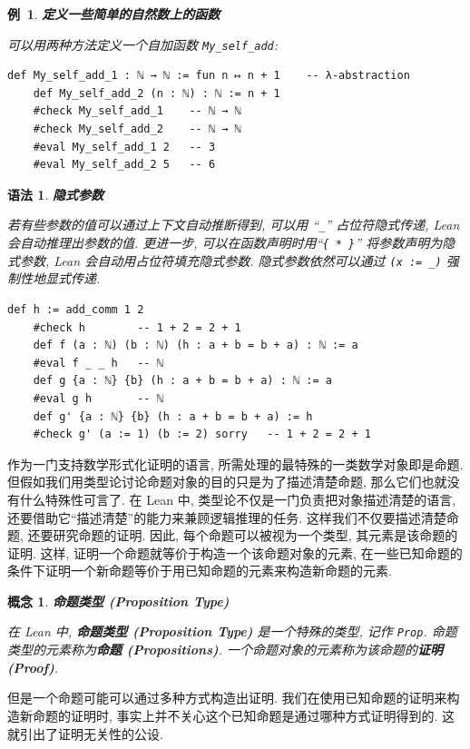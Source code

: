 \documentclass[UTF8]{ctexart}
\DeclareMathOperator{\0}{\mathbf{0}}                    %
\newcommand{\<}{\langle}
\renewcommand{\>}{\rangle}                              %
\newenvironment{dfn_box}{
    \begin{tcolorbox}[enhanced, colback=dfn_green2, boxrule=0pt, frame hidden,
        borderline west={0.7mm}{0.1mm}{dfn_green1},breakable]
    }
    {\end{tcolorbox}}
\newenvironment{thm_box}{
    \begin{tcolorbox}[enhanced, colback=thm_blue2, boxrule=0pt, frame hidden,
        borderline west={0.7mm}{0.1mm}{thm_blue1},breakable]
    }
    {\end{tcolorbox}}
\newenvironment{xmp_box}{
    \begin{tcolorbox}[enhanced, colback=xmp_purple2, boxrule=0pt, frame hidden,
        borderline west={0.7mm}{0.1mm}{xmp_purple1},breakable]
    }
    {\end{tcolorbox}}
\theoremstyle{MyStyle} %
\newtheorem{concept}[definition]{概念}
\newenvironment{cpt}[1]
{
    \begin{dfn_box}
        \begin{concept}
            \textbf{#1}
            \newline
}
{
        \end{concept}
    \end{dfn_box}
}
\newtheorem{syntax}[definition]{语法}
\newenvironment{syn}[1]
{
    \begin{thm_box}
        \begin{syntax}
            \textbf{#1}
            \newline
}
{
        \end{syntax}
    \end{thm_box}
}
\newtheorem{example}{ 例\, }[subsection]
\newenvironment{xmp}[1]
{
    \begin{xmp_box}
        \begin{example}
            \textbf{#1}
            \newline
}
{
        \end{example}
    \end{xmp_box}
}
\newcommand*{\lean}[1]{\texttt{\color{blue}#1}}
\begin{document}
        \begin{xmp}
            {定义一些简单的自然数上的函数}
            可以用两种方法定义一个自加函数 \texttt{My\_self\_add}: 
            \begin{lstlisting}[style=lean]
    def My_self_add_1 : ℕ → ℕ := fun n ↦ n + 1    -- λ-abstraction
    def My_self_add_2 (n : ℕ) : ℕ := n + 1
    #check My_self_add_1    -- ℕ → ℕ
    #check My_self_add_2    -- ℕ → ℕ
    #eval My_self_add_1 2   -- 3
    #eval My_self_add_2 5   -- 6
            \end{lstlisting}
        \end{xmp}

        \begin{syn}
            {隐式参数}
            若有些参数的值可以通过上下文自动推断得到, 可以用 ``\texttt{\_}'' 占位符隐式传递, Lean 会自动推理出参数的值. 更进一步, 可以在函数声明时用``\texttt{\{ * \}}'' 将参数声明为隐式参数, Lean 会自动用占位符填充隐式参数. 隐式参数依然可以通过 \texttt{(x := \_)} 强制性地显式传递. 
            \begin{lstlisting}[style=lean]
    def h := add_comm 1 2
    #check h        -- 1 + 2 = 2 + 1
    def f (a : ℕ) (b : ℕ) (h : a + b = b + a) : ℕ := a
    #eval f _ _ h   -- ℕ
    def g {a : ℕ} {b} (h : a + b = b + a) : ℕ := a
    #eval g h       -- ℕ
    def g' {a : ℕ} {b} (h : a + b = b + a) := h
    #check g' (a := 1) (b := 2) sorry   -- 1 + 2 = 2 + 1
            \end{lstlisting}
        \end{syn}

        作为一门支持数学形式化证明的语言, 所需处理的最特殊的一类数学对象即是命题. 但假如我们用类型论讨论命题对象的目的只是为了描述清楚命题, 那么它们也就没有什么特殊性可言了. 在 Lean 中, 类型论不仅是一门负责把对象描述清楚的语言, 还要借助它``描述清楚''的能力来兼顾逻辑推理的任务. 这样我们不仅要描述清楚命题, 还要研究命题的证明. 因此, 每个命题可以被视为一个类型, 其元素是该命题的证明. 这样, 证明一个命题就等价于构造一个该命题对象的元素, 在一些已知命题的条件下证明一个新命题等价于用已知命题的元素来构造新命题的元素. 

        \begin{cpt}
            {命题类型 (Proposition Type)}
            在 Lean 中, \textbf{命题类型 (Proposition Type)} 是一个特殊的类型, 记作 \lean{Prop}. 命题类型的元素称为\textbf{命题 (Propositions)}. 一个命题对象的元素称为该命题的\textbf{证明 (Proof)}. 
        \end{cpt}
        
        但是一个命题可能可以通过多种方式构造出证明. 我们在使用已知命题的证明来构造新命题的证明时, 事实上并不关心这个已知命题是通过哪种方式证明得到的. 这就引出了证明无关性的公设. 
\end{document}

